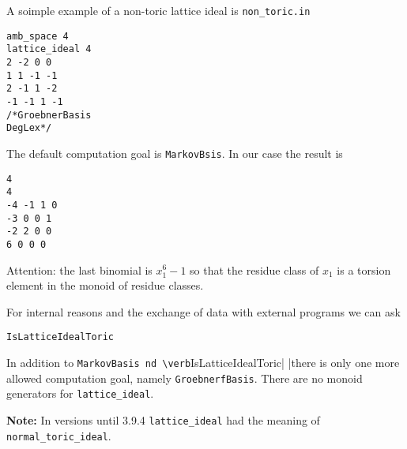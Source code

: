 A soimple example of a non-toric lattice ideal is \verb|non_toric.in|
\begin{Verbatim}
amb_space 4
lattice_ideal 4
2 -2 0 0
1 1 -1 -1
2 -1 1 -2
-1 -1 1 -1
/*GroebnerBasis
DegLex*/
\end{Verbatim}
The default computation goal is \verb|MarkovBsis|. In our case the result is
\begin{Verbatim}
4
4
-4 -1 1 0 
-3 0 0 1 
-2 2 0 0 
6 0 0 0
\end{Verbatim}
Attention: the last binomial is $x_1^6-1$ so that the residue class of $x_1$ is a torsion element in the monoid of residue classes.

For internal reasons and the exchange of data with external programs we can ask
\begin{Verbatim}
IsLatticeIdealToric
\end{Verbatim}

In addition to \verb|MarkovBasis nd \verb|IsLatticeIdealToric| |there is only one more allowed computation goal, namely \verb|GroebnerfBasis|. There are no monoid generators for \verb|lattice_ideal|.

\textbf{Note:} In versions until 3.9.4 \verb|lattice_ideal| had the meaning of \verb|normal_toric_ideal|.